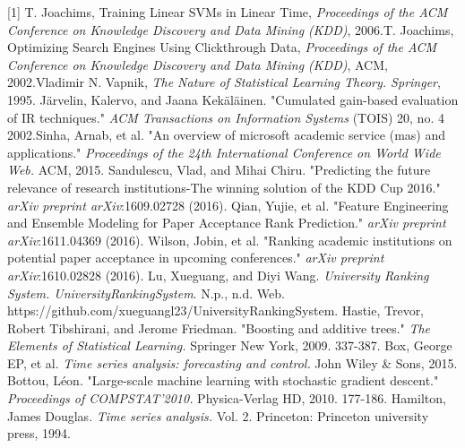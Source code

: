 \documentclass[letterpaper]{article}
\begin{document}
[1] T. Joachims, Training Linear SVMs in Linear Time, {\it Proceedings of the ACM Conference on Knowledge Discovery and Data Mining (KDD)}, 2006.\newline
[2] T. Joachims, Optimizing Search Engines Using Clickthrough Data, {\it Proceedings of the ACM Conference on Knowledge Discovery and Data Mining (KDD)}, ACM, 2002.\newline
[3] Vladimir N. Vapnik, {\it The Nature of Statistical Learning Theory. Springer}, 1995.
\newline
[4] Järvelin, Kalervo, and Jaana Kekäläinen. "Cumulated gain-based evaluation of IR techniques." {\it ACM Transactions on Information Systems} (TOIS) 20, no. 4 2002.\newline
[5]	Sinha, Arnab, et al. "An overview of microsoft academic service (mas) and applications." {\it Proceedings of the 24th International Conference on World Wide Web.} ACM, 2015.
\newline
[6] Sandulescu, Vlad, and Mihai Chiru. "Predicting the future relevance of research institutions-The winning solution of the KDD Cup 2016." {\it arXiv preprint arXiv}:1609.02728 (2016).
\newline
[7]Qian, Yujie, et al. "Feature Engineering and Ensemble Modeling for Paper Acceptance Rank Prediction." {\it arXiv preprint arXiv}:1611.04369 (2016).
\newline
[8] Wilson, Jobin, et al. "Ranking academic institutions on potential paper acceptance in upcoming conferences." {\it arXiv preprint arXiv}:1610.02828 (2016).
\newline
[9] Lu, Xueguang, and Diyi Wang. {\it University Ranking System. UniversityRankingSystem}. N.p., n.d. Web. https://github.com/xueguangl23/UniversityRankingSystem.
\newline
[10]Hastie, Trevor, Robert Tibshirani, and Jerome Friedman. "Boosting and additive trees." {\it The Elements of Statistical Learning.} Springer New York, 2009. 337-387.
\newline
[11]Box, George EP, et al. {\it Time series analysis: forecasting and control.} John Wiley \& Sons, 2015.
\newline
[12]Bottou, Léon. "Large-scale machine learning with stochastic gradient descent." {\it Proceedings of COMPSTAT'2010.} Physica-Verlag HD, 2010. 177-186.
\newline
[13]Hamilton, James Douglas. {\it Time series analysis.} Vol. 2. Princeton: Princeton university press, 1994.
\end{document}
